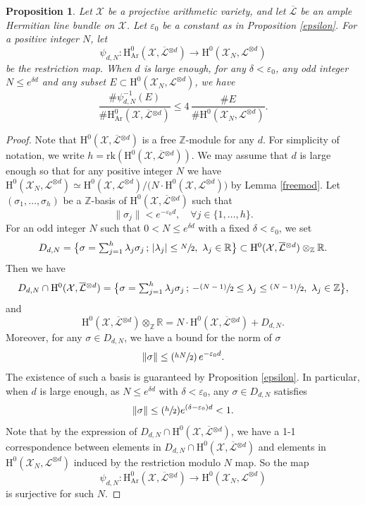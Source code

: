\documentclass[JEP,XML,SOM,Unicode,published]{cedram}
\newcommand{\Psfrac}[2]{(\sfrac{#1}{#2})}
\newcommand{\psfrac}[2]{\sfrac{(#1)}{#2}}
\newcommand{\sep}{\,;\,}
\theoremstyle{plain}
\newtheorem{prop}[thm]{Proposition}
\theoremstyle{definition}
\newcommand{\ho}{\mathrm{H}}
\newcommand{\X}{\mathcal{X}}
\newcommand{\Li}{\overline{\mathcal{L}}{}}
\newcommand{\li}{\mathcal{L}}
\newcommand{\Z}{\mathbb{Z}}
\begin{document}
\begin{prop}\label{ed}
Let $\X$ be a projective arithmetic variety, and let $\Li$ be an ample Hermitian line bundle on $\X$. Let $\varepsilon_0$ be a constant as in Proposition \ref{epsilon}. For a positive integer $N$, let
\[
\psi_{d,N}: \ho^0_{\mathrm{Ar}}(\X,\Li^{\otimes d}) \to \ho^0(\X_{N},\li^{\otimes d})
\]
be the restriction map. When $d$ is large enough, for any $\delta<\varepsilon_0$, any odd integer $N\leq e^{\delta d}$ and any subset $E\subset \ho^0(\X_{N},\li^{\otimes d}) $,
we have
\[
\frac{\#\psi_{d,N}^{-1}(E)}{\# \ho^0_{\mathrm{Ar}}(\X,\Li^{\otimes d})}\leq 4\, \frac{\#E}{\#\ho^0(\X_{N},\li^{\otimes d})}.
\]
\end{prop}
\begin{proof}[Proof]
Note that $\ho^0(\X,\Li^{\otimes d})$ is a free $\Z$-module for any $d$. For simplicity of notation, we write $h=\mathrm{rk}(\ho^0(\X,\Li^{\otimes d}))$. We may assume that $d$ is large enough so that for any positive integer $N$ we have $\ho^0(\X_N,\li^{\otimes d})\simeq\ho^0(\X,\li^{\otimes d})/\big(N\cdot \ho^0(\X,\li^{\otimes d})\big)$ by Lemma \ref{freemod}. Let $(\sigma_1,\dots, \sigma_h)$ be a $\Z$-basis of $\ho^0(\X,\Li^{\otimes d})$ such that
\[
\lVert \sigma_j\rVert <e^{-\varepsilon_0 d}, \quad \forall j\in \{ 1,\dots, h \}.
\]
For an odd integer $N$ such that $0<N\leq e^{\delta d}$ with a fixed $\delta<\varepsilon_0$, we set
\[\textstyle
D_{d,N}=\bigl\{ \sigma=\sum_{j=1}^{h}\lambda_j \sigma_j\sep |\lambda_j|\leq \sfrac{N}{2},\ \lambda_j\in \mathbb{R} \bigr\}\subset \ho^0(\X,\Li^{\otimes d})\otimes_{ \mathbb{Z}}\mathbb{R}.
\]
Then we have
\[\textstyle
D_{d,N}\cap \ho^0(\X,\Li^{\otimes d})=
\bigl\{ \sigma=\sum_{j=1}^{h}\lambda_j \sigma_j\sep -\psfrac{N-1}{2}\leq \lambda_j\leq \psfrac{N-1}{2},\ \lambda_j\in \mathbb{Z} \bigr\},
\]
and
\[
\ho^0(\X,\Li^{\otimes d})\otimes_{ \mathbb{Z}}\mathbb{R}=N\cdot \ho^0(\X,\Li^{\otimes d}) +D_{d, N}.
\]
Moreover, for any $\sigma \in D_{d,N}$, we have a bound for the norm of $\sigma$
\[
\lVert \sigma\rVert \leq \Psfrac{hN}{2}\,e^{-\varepsilon_0 d}.
\]
The existence of such a basis is guaranteed by Proposition \ref{epsilon}. In particular, when $d$ is large enough, as $N\leq e^{\delta d}$ with $\delta <\varepsilon_0$, any $\sigma \in D_{d,N}$ satisfies
\[
\lVert \sigma\rVert \leq \Psfrac{h}{2} e^{(\delta-\varepsilon_0) d}<1.
\]
Note that by the expression of $D_{d,N}\cap \ho^0(\X,\Li^{\otimes d})$, we have a 1-1 correspondence between elements in $D_{d,N}\cap \ho^0(\X,\Li^{\otimes d}) $ and elements in $\ho^0(\X_N, \li^{\otimes d})$ induced by the restriction modulo $N$ map. So the map
\[
\psi_{d,N}: \ho^0_{\mathrm{Ar}}(\X, \Li^{\otimes d}) \to \ho^0(\X_N, \li^{\otimes d})
\]
is surjective for such $N$.


\end{proof}
\end{document}
